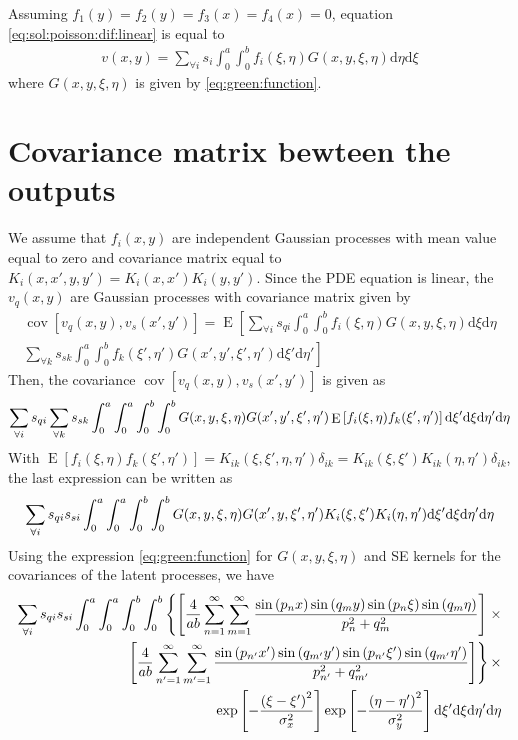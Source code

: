 \documentclass[a4paper,10pt]{article}
\newcommand{\dif}{\textrm{d}}
\DeclareMathOperator{\cov}{cov} \DeclareMathOperator{\ex}{E}
\begin{document}
Assuming $f_1(y) = f_2(y)= f_3(x) = f_4(x) = 0$, equation \eqref{eq:sol:poisson:dif:linear} is equal to
\begin{align}
v(x,y)= \sum_{\forall i}s_{i} \int_{0}^{a}\int_{0}^{b}f_i(\xi,\eta)G(x, y,\xi,\eta)\dif{\eta}\dif{\xi}\label{eq:sol:poisson:dif:linear:init:hom}
\end{align}
where $G(x, y, \xi,\eta)$ is given by \eqref{eq:green:function}.


\section{Covariance matrix bewteen the outputs}

We assume that $f_i(x,y)$ are independent Gaussian processes with
mean value equal to zero and covariance matrix equal to
$K_i(x,x',y,y')=K_i(x,x')K_i(y,y')$. Since the PDE equation is
linear, the $v_q(x,y)$ are Gaussian processes with covariance matrix
given by
\begin{align}
\cov\left[v_q(x,y),v_s(x',y')\right]=\ex\left[\sum_{\forall
i}s_{qi}\int_0^a\int_0^bf_i(\xi,\eta)G(x,y, \xi,\eta)\dif\xi\dif\eta\right.\\
\left.\sum_{\forall
k}s_{sk}\int_0^{a}\int_0^bf_k(\xi',\eta')G(x',y', \xi',\eta')\dif\xi'\dif\eta'\right]
\end{align}
Then, the covariance $\cov\left[v_q(x,y),v_s(x',y')\right]$ is given
as
\begin{align}\notag
\sum_{\forall i}s_{qi}\sum_{\forall
k}s_{sk}\int_0^a\int_0^{a}\int_0^b\int_0^bG(x,y, \xi,\eta)G(x',y',\xi',\eta')\ex\left[f_i(\xi,\eta)f_k(\xi',\eta')\right]
\dif\xi'\dif\xi\dif\eta'\dif\eta
\end{align}
With
$\ex\left[f_i(\xi,\eta)f_k(\xi',\eta')\right]=K_{ik}(\xi,\xi',\eta,\eta')\delta_{ik}=K_{ik}(\xi,\xi')K_{ik}(\eta,\eta')\delta_{ik}$,
the last expression can be written as
\begin{align}\notag
\sum_{\forall
i}s_{qi}s_{si}\int_0^a\int_0^{a}\int_0^b\int_0^bG(x,y, \xi,\eta)G(x',
  y, \xi',\eta')K_i(\xi,\xi')K_i(\eta,\eta')
\dif\xi'\dif\xi\dif\eta'\dif\eta
\end{align}
Using the expression \eqref{eq:green:function} for $G(x,y, \xi,\eta)$ and SE kernels for the
covariances of the latent processes, we have
\begin{align}\notag
\sum_{\forall
i}s_{qi}s_{si}\int_0^a\int_0^{a}\int_0^b\int_0^b\left\{\left[
\frac{4}{ab}\sum_{n=1}^\infty
                  \sum_{m=1}^\infty\frac{\sin\left({p_n x}\right)
\sin\left(q_m y\right)\sin\left(p_n \xi\right)\sin\left(q_m \eta\right)}{p_n^2 + q_m^2}
\right]\right.\times\\\notag
\left.\left[
\frac{4}{ab}\sum_{n'=1}^\infty
                  \sum_{m'=1}^\infty\frac{\sin\left({p_{n'} x'}\right)
\sin\left(q_{m'} y'\right)\sin\left(p_{n'} \xi'\right)\sin\left(q_{m'} \eta'\right)}{p_{n'}^2 + q_{m'}^2}
\right]\right\}\times\\\notag
\exp\left[-\frac{\left(\xi-\xi'\right)^2}{\sigma^2_x}\right]\exp\left[-\frac{\left(\eta-\eta'\right)^2}{\sigma^2_{y}}\right]\dif\xi'\dif\xi\dif\eta'\dif\eta
\end{align}
\end{document}
